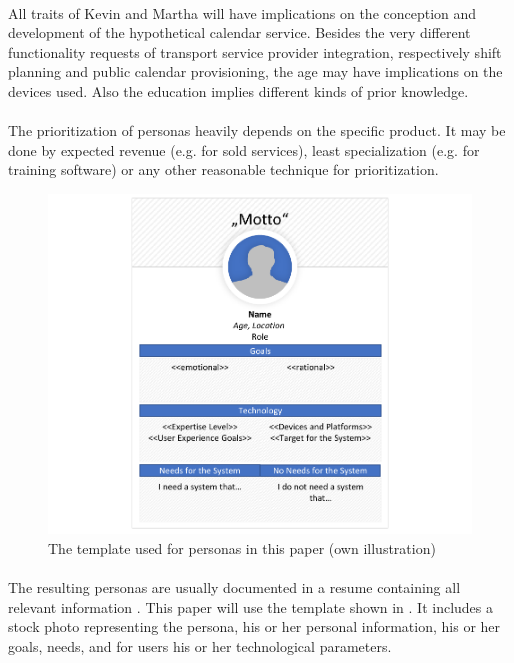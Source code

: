 \paragraph{} All traits of Kevin and Martha will have implications on the conception and development of the hypothetical calendar service. Besides the very different functionality requests of transport service provider integration, respectively shift planning and public calendar provisioning, the age may have implications on the devices used. Also the education implies different kinds of prior knowledge. 

\paragraph{} The prioritization of personas heavily depends on the specific product. It may be done by expected revenue (e.g. for sold services), least specialization (e.g. for training software) or any other reasonable technique for prioritization.

\begin{figure}[H]
    \centering
    \includegraphics[width=\textwidth]{img/PersonaTemplate.pdf}
    \caption[Template for Personas]{The template used for personas in this paper (own illustration)}
    \label{fig:persTemp}
\end{figure}

\paragraph{} The resulting personas are usually documented in a resume containing all relevant information \parencites[cf.][40]{Robier.2016}[cf.][]{Platt.2016}. This paper will use the template shown in . It includes a stock photo representing the persona, his or her personal information, his or her goals, needs, and for users his or her technological parameters.


